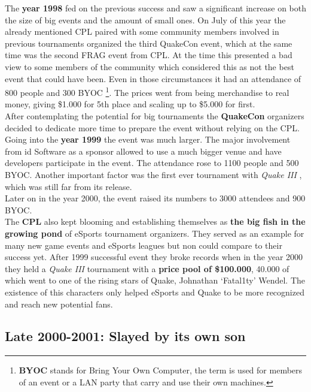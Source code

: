 The \textbf{year 1998} fed on the previous success and saw a significant increase on both the size of big events and the amount of small ones. On July of this year the already mentioned CPL paired with some community members involved in previous tournaments organized the third QuakeCon event, which at the same time was the second FRAG event from CPL. At the time this presented a bad view to some members of the community which considered this as not the best event that could have been. Even in those circumstances it had an attendance of 800 people and 300 BYOC \footnote{\textbf{BYOC} stands for Bring Your Own Computer, the term is used for members of an event or a LAN party that carry and use their own machines.}. The prices went from being merchandise to real money, giving \$1.000 for 5th place and scaling up to \$5.000 for first.\\

After contemplating the potential for big tournaments the \textbf{QuakeCon} organizers decided to dedicate more time to prepare the event without relying on the CPL. Going into the \textbf{year 1999} the event was much larger. The major involvement from id Software as a sponsor allowed to use a much bigger venue and have developers participate in the event. The attendance rose to 1100 people and 500 BYOC. Another important factor was the first ever tournament with \textit{Quake III} \citep{game:quake3}, which was still far from its release.\\ Later on in the year 2000, the event raised its numbers to 3000 attendees and 900 BYOC.\\

The \textbf{CPL} also kept blooming and establishing themselves as \textbf{the big fish in the growing pond} of eSports tournament organizers. They served as an example for many new game events and eSports leagues but non could compare to their success yet. After 1999 successful event they broke records when in the year 2000 they held a \textit{Quake III} tournament with a \textbf{price pool of \$100.000}, 40.000 of which went to one of the rising stars of Quake, Johnathan ‘Fatal1ty’ Wendel. The existence of this characters only helped eSports and Quake to be more recognized and reach new potential fans.


\subsection{Late 2000-2001: Slayed by its own son}






